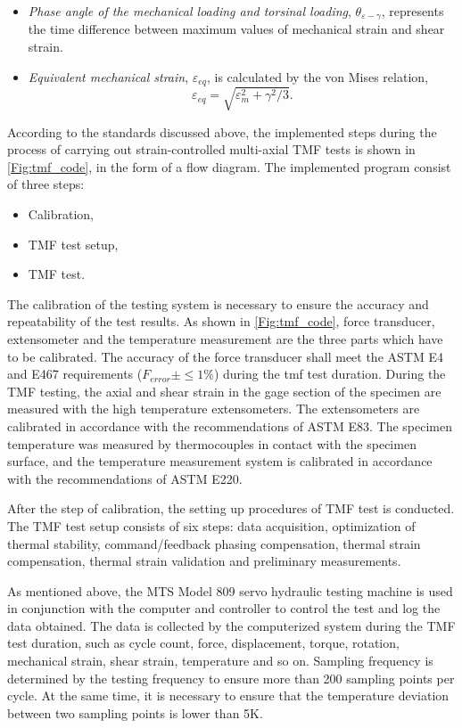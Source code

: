 \begin{itemize}
  \item {\em Phase angle of the mechanical loading and torsinal loading}, $\theta_{\varepsilon-\gamma}$, represents the time difference between maximum values of mechanical strain and shear strain.
  \item {\em Equivalent mechanical strain}, $\varepsilon_{eq}$, is calculated by the von Mises relation\cite{Pol1991Cyclic},
  \begin{equation}
  \varepsilon_{eq}=\sqrt {\varepsilon _m^2 + {\gamma ^2}/3}.
  \end{equation}
\end{itemize}

According to the standards discussed above, the implemented steps during the process of carrying out strain-controlled multi-axial TMF tests is shown in \ref{Fig:tmf_code}, in the form of a flow diagram.
The implemented program consist of three steps: 
\begin{itemize}
  \item Calibration,
  \item TMF test setup,
  \item TMF test.
\end{itemize}

The calibration of the testing system is necessary to ensure the accuracy and repeatability of the test results.
As shown in \ref{Fig:tmf_code}, force transducer, extensometer and the temperature measurement are the three parts which have to be calibrated.
The accuracy of the force transducer shall meet the ASTM E4 and E467 requirements ($F_{error}\pm \leq 1\%$) during the tmf test duration.
During the TMF testing, the axial and shear strain in the gage section of the specimen are measured with the high temperature extensometers. 
The extensometers are calibrated in accordance with the recommendations of ASTM E83.
The specimen temperature was measured by thermocouples in contact with the specimen surface, and the temperature measurement system is calibrated in accordance with the recommendations of ASTM E220.

After the step of calibration, the setting up procedures of TMF test is conducted. 
The TMF test setup consists of six steps: data acquisition, optimization of thermal stability, command/feedback phasing compensation, thermal strain compensation, thermal strain validation and preliminary measurements.

As mentioned above, the MTS Model 809 servo hydraulic testing machine is used in conjunction with the computer and controller to control the test and log the data obtained.
The data is collected by the computerized system during the TMF test duration, such as cycle count, force, displacement, torque, rotation, mechanical strain, shear strain, temperature and so on. Sampling frequency is determined by the testing frequency to ensure more than 200 sampling points per cycle. At the same time, it is necessary to ensure that the temperature deviation between two sampling points is lower than 5K.

